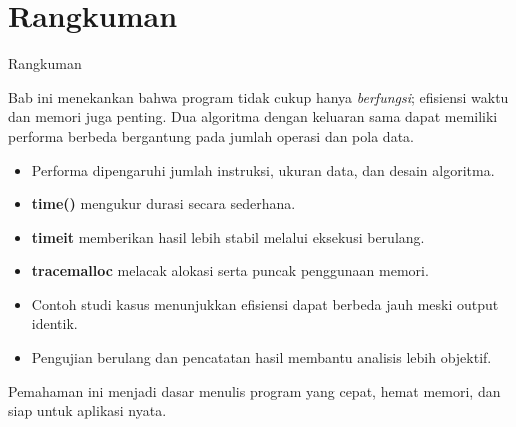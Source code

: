 \documentclass[aspectratio=169, table]{beamer}
\begin{document}
\section{Rangkuman}

\begin{frame}[fragile]{Rangkuman}
\vspace{20pt}

Bab ini menekankan bahwa program tidak cukup hanya \emph{berfungsi}; efisiensi waktu dan memori juga penting. Dua algoritma dengan keluaran sama dapat memiliki performa berbeda bergantung pada jumlah operasi dan pola data.

\begin{itemize}
    \item Performa dipengaruhi jumlah instruksi, ukuran data, dan desain algoritma.
    \item \textbf{time()} mengukur durasi secara sederhana.
    \item \textbf{timeit} memberikan hasil lebih stabil melalui eksekusi berulang.
    \item \textbf{tracemalloc} melacak alokasi serta puncak penggunaan memori.
    \item Contoh studi kasus menunjukkan efisiensi dapat berbeda jauh meski output identik.
    \item Pengujian berulang dan pencatatan hasil membantu analisis lebih objektif.
\end{itemize}

Pemahaman ini menjadi dasar menulis program yang cepat, hemat memori, dan siap untuk aplikasi nyata.

\end{frame}
\end{document}
